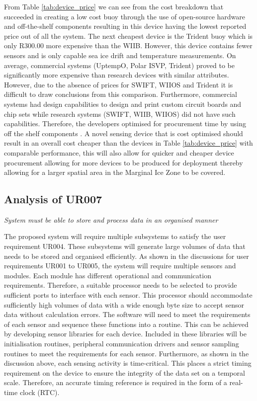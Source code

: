 From Table \ref{tab:device_price} we can see from the cost breakdown that \textcite{rabault2019open} succeeded in creating a low cost buoy through the use of open-source hardware and off-the-shelf components resulting in this device having the lowest reported price out of all the system. The next cheapest device is the Trident buoy which is only R300.00 more expensive than the WIIB. However, this device contains fewer sensors and is only capable sea ice drift and temperature measurements. On average, commercial systems (UptempO, Polar ISVP, Trident) proved to be significantly more expensive than research devices with similar attributes. However, due to the absence of prices for SWIFT, WIIOS and Trident it is difficult to draw conclusions from this comparison. Furthermore, commercial systems had design capabilities to design and print custom circuit boards and chip sets while research systems (SWIFT, WIIB, WIIOS) did not have such capabilities. Therefore, the developers optimised for procurement time by using off the shelf components \cite{kohout2015device,rabault2019open}. A novel sensing device that is cost optimised should result in an overall cost cheaper than the devices in Table \ref{tab:device_price} with comparable performance, this will also allow for quicker and cheaper device procurement allowing for more devices to be produced for deployment thereby allowing for a larger spatial area in the Marginal Ice Zone to be covered.

\subsection{Analysis of UR007}

\textit{System must be able to store and process data in an organised manner}

The proposed system will require multiple subsystems to satisfy the user requirement UR004. These subsystems will generate large volumes of data that needs to be stored and organised efficiently. As shown in the discussions for user requirements UR001 to UR005, the system will require multiple sensors and modules. Each module has different operational and communication requirements. Therefore, a suitable processor needs to be selected to provide sufficient ports to interface with each sensor. This processor should accommodate sufficiently high volumes of data with a wide enough byte size to accept sensor data without calculation errors. The software will need to meet the requirements of each sensor and sequence these functions into a routine. This can be achieved by developing sensor libraries for each device. Included in these libraries will be initialisation routines, peripheral communication drivers and sensor sampling routines to meet the requirements for each sensor. Furthermore, as shown in the discussion above, each sensing activity is time-critical. This places a strict timing requirement on the device to ensure the integrity of the data set on a temporal scale. Therefore, an accurate timing reference is required in the form of a real-time clock (RTC). \par 

